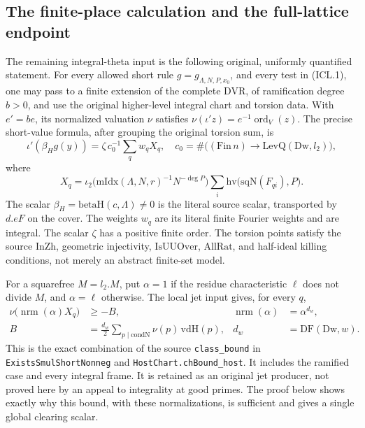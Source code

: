 
\subsection{The finite-place calculation and the full-lattice endpoint}

The remaining integral-theta input is the following original,
uniformly quantified statement.  For every allowed short
rule \(g=g_{\Lambda,N,P,x_0}\), and every test in (ICL.1),
one may pass to a finite extension of the complete DVR,
of ramification degree \(b>0\), and use the original
higher-level integral chart and torsion data.  With
\(e'=be\), its normalized valuation \(\nu\) satisfies
\(\nu(\iota' z)=e^{-1}\operatorname{ord}_{V}(z)\).
The precise short-value formula, after grouping the
original torsion sum, is
\[
 \iota'(\beta_H g(y))
       =\zeta\,c_0^{-1}\sum_{q}w_q X_q,
 \quad c_0=\#\bigl((\mathrm{Fin}\,n)\to
                              \mathrm{LevQ}(\mathrm{Dw},l_2)\bigr),
                                                               \tag{ICL.13}
\]
where
\[
 X_q=\iota_2\bigl(\mathrm{mIdx}(\Lambda,N,r)^{-1}
                                     N^{-\deg P}\bigr)
       \sum_i\mathrm{hv}\bigl(\mathrm{sqN}(F_{qi}),P\bigr).
\]
The scalar \(\beta_H=\mathrm{betaH}(c,\Lambda)\ne0\)
is the literal source scalar, transported by \(d.eF\)
on the cover.  The weights \(w_q\) are its literal finite
Fourier weights and are integral.  The scalar \(\zeta\)
has a positive finite order.  The torsion points satisfy
the source \(\mathrm{InZh}\), geometric injectivity,
\(\mathrm{IsUUOver}\), \(\mathrm{AllRat}\), and
half-ideal killing conditions, not merely an abstract
finite-set model.

For a squarefree \(M=l_2.M\), put \(\alpha=1\) if
the residue characteristic \(\ell\) does not divide
\(M\), and \(\alpha=\ell\) otherwise.  The local
jet input gives, for every \(q\),
\begin{align}
 \nu\bigl(\operatorname{nrm}(\alpha)X_q\bigr)&\geq-B,
       &\operatorname{nrm}(\alpha)&=\alpha^{d_w},       \tag{ICL.14}\\
 B&=\frac{d_w}{2}\sum_{p\mid\mathrm{condN}}
                        \nu(p)\,\mathrm{vdH}(p),
       &d_w&=\mathrm{DF}(\mathrm{Dw},w).               \tag{ICL.15}
\end{align}
This is the exact combination of the source
\texttt{class\_bound} in \texttt{ExistsSmulShortNonneg}
and \texttt{HostChart.chBound\_host}.  It includes the
ramified case and every integral frame.  It is retained
as an original jet producer, not proved here by an
appeal to integrality at good primes.  The proof below
shows exactly why this bound, with these normalizations,
is sufficient and gives a single global clearing scalar.

